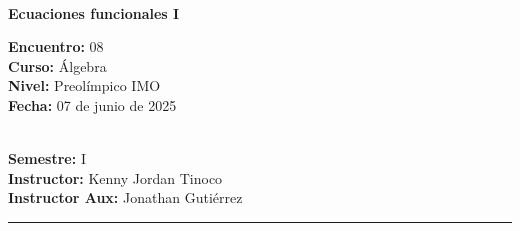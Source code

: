 \begin{center}
    \ \\
    \vspace{-1mm}
    \textbf{\Large Ecuaciones funcionales I}
\end{center}
\vspace{-5mm}
\begin{multicols}{2}
{
    \textbf{Encuentro:} 08\\
    \textbf{Curso:} Álgebra\\
    \textbf{Nivel:} Preolímpico IMO\\
    \textbf{Fecha:} 07 de junio de 2025\\
    \begin{flushright}
        \ \\
        \textbf{Semestre:} I\\
        \textbf{Instructor:} Kenny Jordan Tinoco\\
        \textbf{Instructor Aux:} Jonathan Gutiérrez
    \end{flushright}
}
\end{multicols}
\vspace{-4mm}
\hrule
\tableofcontents

\thispagestyle{first-page-style}